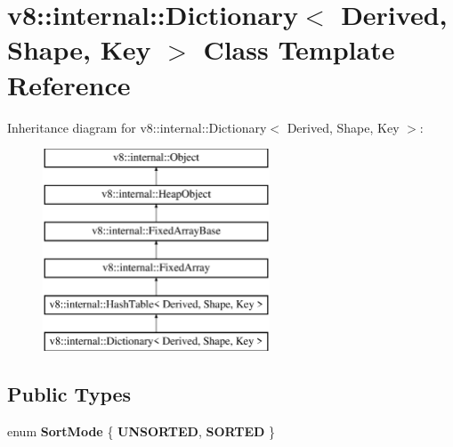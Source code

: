 \hypertarget{classv8_1_1internal_1_1_dictionary}{}\section{v8\+:\+:internal\+:\+:Dictionary$<$ Derived, Shape, Key $>$ Class Template Reference}
\label{classv8_1_1internal_1_1_dictionary}
Inheritance diagram for v8\+:\+:internal\+:\+:Dictionary$<$ Derived, Shape, Key $>$\+:\begin{figure}[H]
\begin{center}
\leavevmode
\includegraphics[height=6.000000cm]{classv8_1_1internal_1_1_dictionary}
\end{center}
\end{figure}
\subsection*{Public Types}
\begin{DoxyCompactItemize}
\item 
\hypertarget{classv8_1_1internal_1_1_dictionary_a0090026b780259a31ce767ac796c6200}{}enum {\bfseries Sort\+Mode} \{ {\bfseries U\+N\+S\+O\+R\+T\+E\+D}, 
{\bfseries S\+O\+R\+T\+E\+D}
 \}\label{classv8_1_1internal_1_1_dictionary_a0090026b780259a31ce767ac796c6200}

\end{DoxyCompactItemize}

